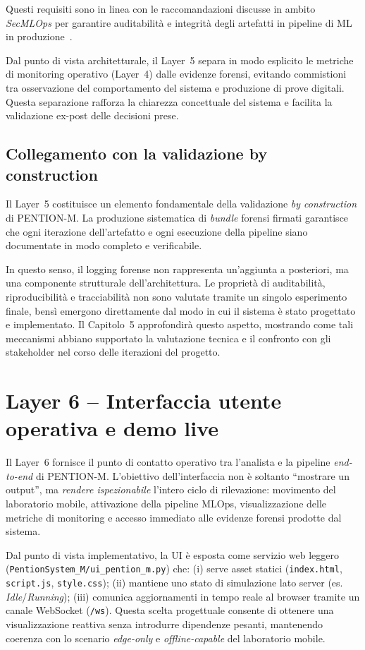 Questi requisiti sono in linea con le raccomandazioni discusse in ambito \emph{SecMLOps} per garantire auditabilità e integrità degli artefatti in pipeline di ML in produzione~\cite{calefato_secmlops}.

Dal punto di vista architetturale, il Layer~5 separa in modo esplicito le metriche di monitoring operativo (Layer~4) dalle evidenze forensi, evitando commistioni tra osservazione del comportamento del sistema e produzione di prove digitali.
Questa separazione rafforza la chiarezza concettuale del sistema e facilita la validazione ex-post delle decisioni prese.

\subsection{Collegamento con la validazione by construction}

Il Layer~5 costituisce un elemento fondamentale della validazione \emph{by construction} di \textsc{PENTION-M}.
La produzione sistematica di \textit{bundle} forensi firmati garantisce che ogni iterazione dell’artefatto e ogni esecuzione della pipeline siano documentate in modo completo e verificabile.

In questo senso, il logging forense non rappresenta un’aggiunta a posteriori, ma una componente strutturale dell’architettura.
Le proprietà di auditabilità, riproducibilità e tracciabilità non sono valutate tramite un singolo esperimento finale, bensì emergono direttamente dal modo in cui il sistema è stato progettato e implementato.
Il Capitolo~5 approfondirà questo aspetto, mostrando come tali meccanismi abbiano supportato la valutazione tecnica e il confronto con gli stakeholder nel corso delle iterazioni del progetto.

\section{Layer 6 -- Interfaccia utente operativa e demo live}
\label{sec:layer6_ui}

Il Layer~6 fornisce il punto di contatto operativo tra l’analista e la pipeline \textit{end-to-end} di \textsc{PENTION-M}.
L’obiettivo dell’interfaccia non è soltanto ``mostrare un output'', ma \emph{rendere ispezionabile} l’intero ciclo di rilevazione: movimento del laboratorio mobile, attivazione della pipeline MLOps, visualizzazione delle metriche di monitoring e accesso immediato alle evidenze forensi prodotte dal sistema.

Dal punto di vista implementativo, la UI è esposta come servizio web leggero (\texttt{PentionSystem\_M/ui\_pention\_m.py}) che:
(i) serve asset statici (\texttt{index.html}, \texttt{script.js}, \texttt{style.css});
(ii) mantiene uno stato di simulazione lato server (es. \textit{Idle}/\textit{Running});
(iii) comunica aggiornamenti in tempo reale al browser tramite un canale WebSocket (\texttt{/ws}).
Questa scelta progettuale consente di ottenere una visualizzazione reattiva senza introdurre dipendenze pesanti, mantenendo coerenza con lo scenario \emph{edge-only} e \emph{offline-capable} del laboratorio mobile.

